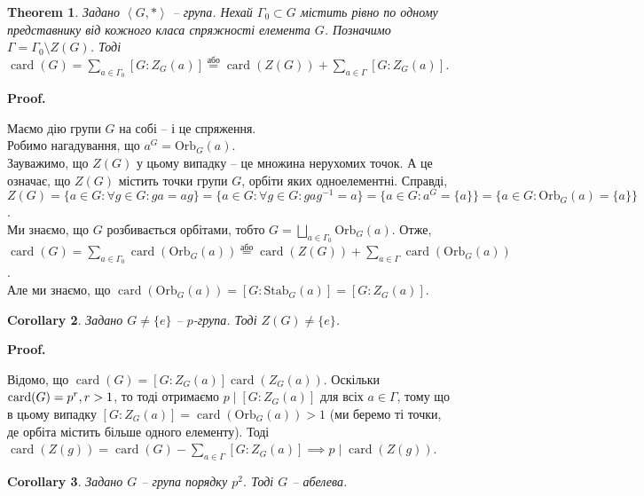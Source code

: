 \documentclass[a4paper, 10pt]{article}
\makeatletter
\theoremstyle{theoremdd}
\newtheorem{theorem}{Theorem}[subsection]
\theoremstyle{theoremdd}
\theoremstyle{theoremdd}
\theoremstyle{theoremdd}
\theoremstyle{theoremdd}
\theoremstyle{theoremdd}
\theoremstyle{theoremdd}
\theoremstyle{theoremdd}
\theoremstyle{theoremdd}
\theoremstyle{theoremdd}
\theoremstyle{theoremdd}
\theoremstyle{theoremdd}
\theoremstyle{theoremdd}
\theoremstyle{theoremdd}
\newtheorem{corollary}[theorem]{Corollary}
\theoremstyle{theoremdd}
\renewenvironment{proof}[1][Proof.\\]{\par
\pushQED{\hfill \qed}%
\normalfont \topsep6\p@\@plus6\p@\relax
\trivlist
\item\relax
{\bfseries
#1\@addpunct{.}}\hspace\labelsep\ignorespaces
}{%
\popQED\endtrivlist\@endpefalse
}
\DeclareMathOperator{\card}{card}
\newcommand\Orb{\text{Orb}}
\newcommand\Stab{\text{Stab}}
\makeatother
\begin{document}
\begin{theorem}
Задано $\left< G,* \right>$ -- група. Нехай $\Gamma_0 \subset G$ містить рівно по одному представнику від кожного класа спряжності елемента $G$. Позначимо $\Gamma = \Gamma_0 \setminus Z(G)$. Тоді\\
$\card(G) = \displaystyle\sum_{a \in \Gamma_0} [G: Z_G(a)] \overset{\text{або}}{=} \card(Z(G)) + \sum_{a \in \Gamma} [G: Z_G(a)]$.
\end{theorem}

\begin{proof}
Маємо дію групи $G$ на собі -- і це спряження. \\
Робимо нагадування, що $a^G = \Orb_G(a)$.\\
Зауважимо, що $Z(G)$ у цьому випадку -- це множина нерухомих точок. А це означає, що $Z(G)$ містить точки групи $G$, орбіти яких одноелементні. Справді,\\
$Z(G) = \{ a \in G: \forall g \in G: ga = ag \} = \{a \in G: \forall g \in G: gag^{-1} = a\} = \{a \in G: a^G = \{a\}\} = \{a \in G: \Orb_G(a) = \{a\}\}$.\\
Ми знаємо, що $G$  розбивається орбітами, тобто $G = \displaystyle\bigsqcup_{a \in \Gamma_0} \Orb_G(a)$. Отже,\\
$\card(G) = \displaystyle\sum_{a \in \Gamma_0} \card(\Orb_G(a)) \overset{\text{або}}{=} \card(Z(G)) + \sum_{a \in \Gamma} \card(\Orb_G(a))$.\\
Але ми знаємо, що $\card(\Orb_G(a)) = [G:\Stab_G(a)] = [G:Z_G(a)]$.
\end{proof}

\begin{corollary}
Задано $G \neq \{e\}$ -- $p$-група. Тоді $Z(G) \neq \{e\}$.
\end{corollary}

\begin{proof}
Відомо, що $\card(G) = [G \!: \! Z_G(a)] \card(Z_G(a))$. Оскільки $\card(G) = p^r, \\ r > 1$, то тоді отримаємо $p \mid [G \!: \! Z_G(a)]$ для всіх $a \in \Gamma$, тому що в цьому випадку $[G:Z_G(a)] = \card(\Orb_G(a)) > 1$ (ми беремо ті точки, де орбіта містить більше одного елементу). Тоді\\
$\card(Z(g)) = \card(G) - \displaystyle\sum_{a \in \Gamma}[G: Z_G(a)] \implies p \mid \card(Z(g))$.
\end{proof}

\begin{corollary}
Задано $G$ -- група порядку $p^2$. Тоді $G$ -- абелева.
\end{corollary}
\end{document}
